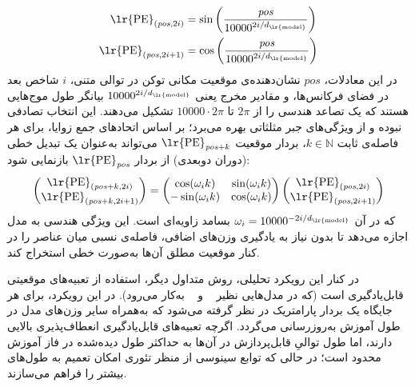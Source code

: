 \begin{align}
    \text{\lr{PE}}_{(\mathit{pos}, 2i)} &= \sin\left(\frac{\mathit{pos}}{10000^{2i/d_{\text{\lr{model}}}}}\right) \label{eq:chap2_pe_sin} \\
    \text{\lr{PE}}_{(\mathit{pos}, 2i+1)} &= \cos\left(\frac{\mathit{pos}}{10000^{2i/d_{\text{\lr{model}}}}}\right) \label{eq:chap2_pe_cos}
\end{align}
در این معادلات، $\mathit{pos}$ نشان‌دهنده‌ی موقعیت مکانی توکن در توالی متنی، $i$ شاخص بعد در فضای فرکانس‌ها، و مقادیر مخرج یعنی $10000^{2i/d_{\text{\lr{model}}}}$ بیانگر طول موج‌هایی هستند که یک تصاعد هندسی را از $2\pi$ تا $10000 \cdot 2\pi$ تشکیل می‌دهند. این انتخاب تصادفی نبوده و از ویژگی‌های جبر مثلثاتی بهره می‌برد؛ بر اساس اتحادهای جمع زوایا، برای هر فاصله‌ی ثابت $k \in \mathbb{N}$، بردار موقعیت $\text{\lr{PE}}_{\mathit{pos}+k}$ می‌تواند به‌عنوان یک تبدیل خطی (دوران دوبعدی) از بردار $\text{\lr{PE}}_{\mathit{pos}}$ بازنمایی شود:\vspace{0.15cm}
\begin{equation}\label{eq:chap2_pe_rotation}
    \begin{pmatrix} 
        \text{\lr{PE}}_{(\mathit{pos}+k, 2i)} \\ 
        \text{\lr{PE}}_{(\mathit{pos}+k, 2i+1)} 
    \end{pmatrix} 
    = 
    \begin{pmatrix} 
        \cos(\omega_i k) & \sin(\omega_i k) \\ 
        -\sin(\omega_i k) & \cos(\omega_i k) 
    \end{pmatrix} 
    \begin{pmatrix} 
        \text{\lr{PE}}_{(\mathit{pos}, 2i)} \\ 
        \text{\lr{PE}}_{(\mathit{pos}, 2i+1)} 
    \end{pmatrix}
    \vspace{0.15cm}
\end{equation}
که در آن $\omega_i = 10000^{-2i/d_{\text{\lr{model}}}}$ بسامد زاویه‌ای است. این ویژگی هندسی به مدل اجازه می‌دهد تا بدون نیاز به یادگیری وزن‌های اضافی، فاصله‌ی نسبی میان عناصر را در کنار موقعیت مطلق آن‌ها به‌صورت خطی استخراج کند.

در کنار این رویکرد تحلیلی، روش متداول دیگر، استفاده از تعبیه‌های موقعیتی قابل‌یادگیری است (که در مدل‌هایی نظیر ~\cite{devlin2019bert} و ~\cite{brown2020language} به‌کار می‌رود). در این رویکرد، برای هر جایگاه یک بردار پارامتریک در نظر گرفته می‌شود که به‌همراه سایر وزن‌های مدل در طول آموزش به‌روزرسانی می‌گردد. اگرچه تعبیه‌های قابل‌یادگیری انعطاف‌پذیری بالایی دارند، اما طول توالیِ قابل‌پردازش در آن‌ها به حداکثر طول دیده‌شده در فاز آموزش محدود است؛ در حالی که توابع سینوسی از منظر تئوری امکان تعمیم به طول‌های بیشتر را فراهم می‌سازند.


